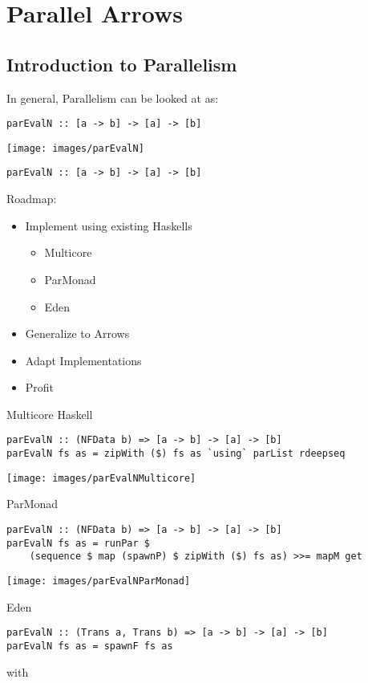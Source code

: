 \section{Parallel Arrows}
\subsection{Introduction to Parallelism}
\begin{frame}[fragile]
In general, Parallelism can be looked at as:
\begin{lstlisting}[frame=htrbl]
parEvalN :: [a -> b] -> [a] -> [b]
\end{lstlisting}
\begin{center}
\texttt{[image: images/parEvalN]}
\end{center}
\end{frame}
\begin{frame}[fragile]
\begin{lstlisting}[frame=htrbl]
parEvalN :: [a -> b] -> [a] -> [b]
\end{lstlisting}
Roadmap:
\begin{itemize}
\item Implement using existing Haskells
\begin{itemize}
\item Multicore
\item ParMonad
\item Eden
\end{itemize}
\item Generalize to Arrows
\item Adapt Implementations
\item Profit
\end{itemize}
\end{frame}

\begin{frame}[fragile]{Multicore Haskell}
\begin{lstlisting}[frame=htrbl]
parEvalN :: (NFData b) => [a -> b] -> [a] -> [b]
parEvalN fs as = zipWith ($) fs as `using` parList rdeepseq
\end{lstlisting}
\begin{center}
	\texttt{[image: images/parEvalNMulticore]}
\end{center}
\end{frame}

\begin{frame}[fragile]{ParMonad}
\begin{lstlisting}[frame=htrbl]
parEvalN :: (NFData b) => [a -> b] -> [a] -> [b]
parEvalN fs as = runPar $ 
	(sequence $ map (spawnP) $ zipWith ($) fs as) >>= mapM get
\end{lstlisting}
\begin{center}
\texttt{[image: images/parEvalNParMonad]}
\end{center}
\end{frame}

\begin{frame}[fragile]{Eden}
\begin{lstlisting}[frame=htrbl]
parEvalN :: (Trans a, Trans b) => [a -> b] -> [a] -> [b]
parEvalN fs as = spawnF fs as
\end{lstlisting}
with
\\~\\
\end{frame}